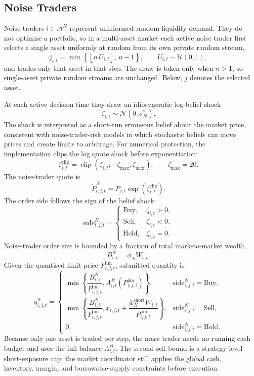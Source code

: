 \documentclass[12pt, a4paper]{article}
\DeclareMathOperator{\clip}{clip}
\begin{document}
    \subsection{Noise Traders}

    Noise traders \(i\in\mathcal{A}^N\) represent uninformed random-liquidity
    demand. They do not optimise a portfolio, so in a multi-asset market each
    active noise trader first selects a single asset uniformly at random from its
    own private random stream,
    \[
        j_{i,t}
        =
        \min\left\{\left\lfloor n\,U_{i,t}\right\rfloor,\,n-1\right\},
        \qquad
        U_{i,t}\sim\mathcal{U}(0,1),
    \]
    and trades only that asset in that step. The draw is taken only when
    \(n>1\), so single-asset private random streams are unchanged. Below,
    \(j\) denotes the selected asset.

    At each active decision time they draw an idiosyncratic log-belief shock
    \[
        \zeta_{i,t}\sim\mathcal{N}(0,\sigma_N^2).
    \]
    The shock is interpreted as a short-run erroneous belief about the market price,
    consistent with noise-trader-risk models in which stochastic beliefs can move
    prices and create limits to arbitrage. For numerical protection, the
    implementation clips the log quote shock before exponentiation:
    \[
        \zeta_{i,t}^{\mathrm{clip}}
        =
        \clip\!\left(\zeta_{i,t};-\zeta_{\max},\zeta_{\max}\right),
        \qquad
        \zeta_{\max}=20.
    \]
    The noise-trader quote is
    \[
        \tilde P_{i,j,t}^{N}=P_{j,t}\exp(\zeta_{i,t}^{\mathrm{clip}}).
    \]
    The order side follows the sign of the belief shock:
    \[
        \mathrm{side}_{i,j,t}^{N}=
        \begin{cases}
            \mathrm{Buy}, & \zeta_{i,t}>0,\\
            \mathrm{Sell}, & \zeta_{i,t}<0,\\
            \mathrm{Hold}, & \zeta_{i,t}=0.
        \end{cases}
    \]
    Noise-trader order size is bounded by a fraction of total mark-to-market
    wealth,
    \[
        B_{i,t}^{N}=\phi_N W_{i,t}.
    \]
    Given the quantised limit price \(P_{i,j,t}^{\text{lim}}\), submitted quantity is
    \[
        q_{i,j,t}^{N}=
        \begin{cases}
            \min\left\{\dfrac{B_{i,t}^{N}}{P_{i,j,t}^{\text{lim}}},
                    A_{i,t}^{B}(P_{i,j,t}^{\text{lim}})\right\}, & \mathrm{side}_{i,j,t}^{N}=\mathrm{Buy},\\[1.2ex]
            \min\left\{\dfrac{B_{i,t}^{N}}{P_{i,j,t}^{\text{lim}}},
            x_{i,j,t}+\dfrac{\bar w_N^{\text{short}}W_{i,t}}{P_{i,j,t}^{\text{lim}}}\right\}, & \mathrm{side}_{i,j,t}^{N}=\mathrm{Sell},\\[1.2ex]
            0, & \mathrm{side}_{i,j,t}^{N}=\mathrm{Hold}.
        \end{cases}
    \]
    Because only one asset is traded per step, the noise trader needs no running
    cash budget and uses the full balance \(A_{i,t}^{B}\).
    The second sell bound is a strategy-level short-exposure cap; the market
    coordinator still applies the global cash, inventory, margin, and
    borrowable-supply constraints before execution.
\end{document}

